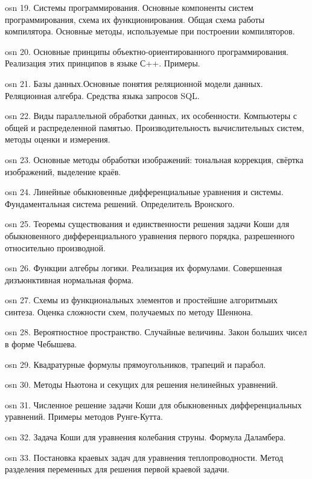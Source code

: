 osn 19. Системы программирования. Основные компоненты систем программирования, схема их функционирования. Общая схема работы компилятора. Основные методы, используемые при построении компиляторов.

osn 20. Основные принципы объектно-ориентированного программирования. Реализация этих принципов в языке С++. Примеры.

osn 21. Базы данных.Основные понятия реляционной модели данных. Реляционная алгебра. Средства языка запросов SQL.

osn 22. Виды параллельной обработки данных, их особенности. Компьютеры с общей и распределенной памятью. Производительность вычислительных систем, методы оценки и измерения.

osn 23. Основные методы обработки изображений: тональная коррекция, свёртка изображений, выделение краёв.

osn 24. Линейные обыкновенные дифференциальные уравнения и системы. Фундаментальная система решений. Определитель Вронского.

osn 25. Теоремы существования и единственности решения задачи Коши для обыкновенного дифференциального уравнения первого порядка, разрешенного относительно производной.

osn 26. Функции алгебры логики. Реализация их формулами. Совершенная дизъюнктивная нормальная форма.

osn 27. Схемы из функциональных элементов и простейшие алгоритмыих синтеза. Оценка сложности схем, получаемых по методу Шеннона.

osn 28. Вероятностное пространство. Случайные величины. Закон больших чисел в форме Чебышева.

osn 29. Квадратурные формулы прямоугольников, трапеций и парабол.

osn 30. Методы Ньютона и секущих для решения нелинейных уравнений.

osn 31. Численное решение задачи Коши для обыкновенных дифференциальных уравнений. Примеры методов Рунге-Кутта.

osn 32. Задача Коши для уравнения колебания струны. Формула Даламбера.

osn 33. Постановка краевых задач для уравнения теплопроводности.  Метод разделения переменных для решения первой краевой задачи.
